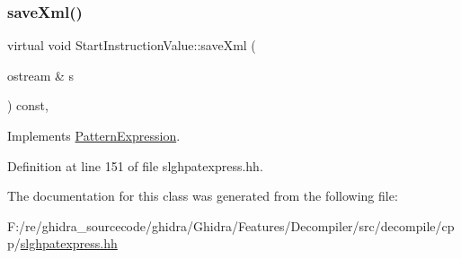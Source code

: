 \subsubsection{\texorpdfstring{saveXml()}{saveXml()}}
{\footnotesize\ttfamily virtual void Start\+Instruction\+Value\+::save\+Xml (\begin{DoxyParamCaption}\item[{ostream \&}]{s }\end{DoxyParamCaption}) const\hspace{0.3cm}{\ttfamily [inline]}, {\ttfamily [virtual]}}



Implements \mbox{\hyperlink{class_pattern_expression_a0d9c89ffbf4a22fac68189a845cde92a}{Pattern\+Expression}}.



Definition at line 151 of file slghpatexpress.\+hh.



The documentation for this class was generated from the following file\+:\begin{DoxyCompactItemize}
\item 
F\+:/re/ghidra\+\_\+sourcecode/ghidra/\+Ghidra/\+Features/\+Decompiler/src/decompile/cpp/\mbox{\hyperlink{slghpatexpress_8hh}{slghpatexpress.\+hh}}\end{DoxyCompactItemize}
